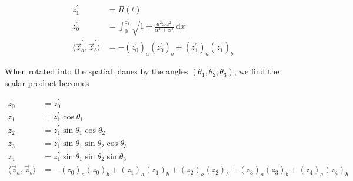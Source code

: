 \documentclass[preprint,notitlepage,amsmath,amssymb,floatfix]{revtex4-1}
\newcommand{\XXX}[3]{{\bf [#1: } {\tt #3} {\it -#2-}{\bf ]}}
\begin{document}
\begin{align}
z^\prime_1 &= R\left(t\right) \\
z^\prime_0 &= \int_0^{z^\prime_1} \! \sqrt{1 + \frac{a^2x\alpha^2}{\alpha^3 + x^3}} \, \mathrm{d}x \\
\langle \vec{z}^\prime_a, \vec{z}^\prime_b \rangle &= -\left(z^\prime_0\right)_a \left(z^\prime_0\right)_b + \left(z^\prime_1\right)_a \left(z^\prime_1\right)_b
\end{align}

\noindent When rotated into the spatial planes by the angles $(\theta_1, \theta_2, \theta_3)$, we find the scalar product becomes 

\begin{align}
z_0 &= z^\prime_0 \\
z_1 &= z^\prime_1\cos\theta_1 \\
z_2 &= z^\prime_1\sin\theta_1\cos\theta_2 \\
z_3 &= z^\prime_1\sin\theta_1\sin\theta_2\cos\theta_3 \\
z_4 &= z^\prime_1\sin\theta_1\sin\theta_2\sin\theta_3 \\
\langle \vec{z}_a, \vec{z}_b \rangle &= -\left(z_0\right)_a\left(z_0\right)_b + \left(z_1\right)_a\left(z_1\right)_b + \left(z_2\right)_a\left(z_2\right)_b + \left(z_3\right)_a\left(z_3\right)_b + \left(z_4\right)_a\left(z_4\right)_b
\end{align}

\end{document}
